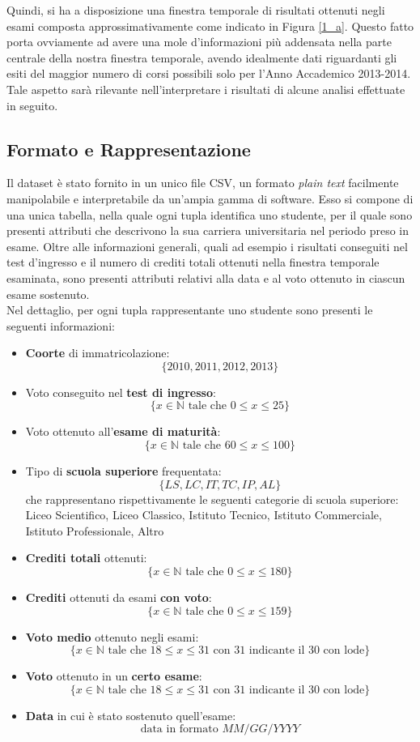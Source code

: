 Quindi, si ha a disposizione una finestra temporale di risultati ottenuti negli esami composta approssimativamente come indicato in Figura \ref{1_a}. Questo fatto porta ovviamente ad avere una mole d'informazioni più addensata nella parte centrale della nostra finestra temporale, avendo idealmente dati riguardanti gli esiti del maggior numero di corsi possibili solo per l'Anno Accademico 2013-2014. Tale aspetto sarà rilevante nell'interpretare i risultati di alcune analisi effettuate in seguito.

\subsection{Formato e Rappresentazione}

Il dataset è stato fornito in un unico file CSV, un formato \textit{plain text} facilmente manipolabile e interpretabile da un'ampia gamma di software. Esso si compone di una unica tabella, nella quale ogni tupla identifica uno studente, per il quale sono presenti attributi che descrivono la sua carriera universitaria nel periodo preso in esame. Oltre alle informazioni generali, quali ad esempio i risultati conseguiti nel test d'ingresso e il numero di crediti totali ottenuti nella finestra temporale esaminata, sono presenti attributi relativi alla data e al voto ottenuto in ciascun esame sostenuto. \\

Nel dettaglio, per ogni tupla rappresentante uno studente sono presenti le seguenti informazioni:

\begin{itemize}
	\item \textbf{Coorte} di immatricolazione: $$ \{2010, 2011, 2012, 2013\} $$
	\item Voto conseguito nel \textbf{test di ingresso}: $$ \{ x \in \mathbb{N} \text{ tale che } 0 \leq x \leq 25\} $$
	\item Voto ottenuto all'\textbf{esame di maturità}: $$ \{ x \in \mathbb{N} \text{ tale che } 60 \leq x \leq 100\} $$
	\item Tipo di \textbf{scuola superiore} frequentata: $$ \{LS, LC, IT, TC, IP, AL \} $$ che rappresentano rispettivamente le seguenti categorie di scuola superiore: Liceo Scientifico, Liceo Classico, Istituto Tecnico, Istituto Commerciale, Istituto Professionale, Altro
	\item \textbf{Crediti totali} ottenuti: $$ \{ x \in \mathbb{N} \text{ tale che } 0 \leq x \leq 180\} $$
	\item \textbf{Crediti} ottenuti da esami \textbf{con voto}: $$ \{ x \in \mathbb{N} \text{ tale che } 0 \leq x \leq 159\} $$
	\item \textbf{Voto medio} ottenuto negli esami: $$ \{ x \in \mathbb{N} \text{ tale che } 18 \leq x \leq 31 \text { con 31 indicante il 30 con lode}\} $$
	\item \textbf{Voto} ottenuto in un \textbf{certo esame}: $$ \{ x \in \mathbb{N} \text{ tale che } 18 \leq x \leq 31 \text { con 31 indicante il 30 con lode}\} $$
	\item \textbf{Data} in cui è stato sostenuto quell'esame: $$ \text{data in formato }MM/GG/YYYY $$
\end{itemize}


